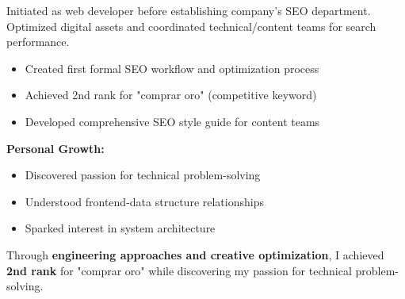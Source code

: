 \documentclass[a4paper,10pt]{article}
\begin{document}
{\begin{minipage}{\dimexpr\textwidth-2\fboxsep\relax}
		Initiated as web developer before establishing company's SEO department. Optimized digital assets and coordinated technical/content teams for search performance.

		\vspace{0.2cm}
		\begin{itemize}[label=\textcolor{darkblue}{\textbullet}, leftmargin=*, nosep]
			\item Created first formal SEO workflow and optimization process
			\item Achieved 2nd rank for "comprar oro" (competitive keyword)
			\item Developed comprehensive SEO style guide for content teams
		\end{itemize}

		\vspace{0.2cm}
		\textbf{Personal Growth:}
		\vspace{0.2cm}
		\begin{itemize}[label=\textcolor{darkblue}{\textbullet}, leftmargin=*, nosep]
			\item Discovered passion for technical problem-solving
			\item Understood frontend-data structure relationships
			\item Sparked interest in system architecture
		\end{itemize}

        \vspace{0.2cm}


        Through \textbf{engineering approaches and creative optimization}, I achieved \textbf{2nd
        rank} for "comprar oro" while discovering my passion for technical problem-solving.


		\vspace{0.2cm} %
\end{minipage}}


\end{document}
